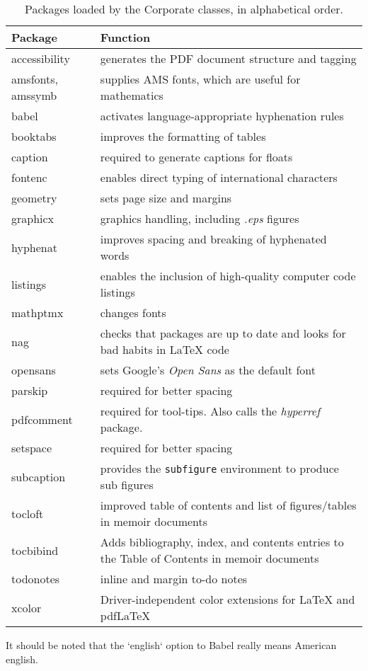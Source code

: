 \begin{table*}[!ht]
\centering
\caption[Packages loaded by the Corporate classes]{Packages loaded by the Corporate classes, in alphabetical order.}
\label{Tab:Packages}
\begin{tabular}[h]{l p{}}
\toprule
Package & Function\\
\midrule
accessibility & generates the PDF document structure and tagging \\
amsfonts, amssymb& supplies AMS fonts, which are useful for mathematics \\
babel & activates language-appropriate hyphenation rules\\
booktabs & improves the formatting of tables \\
caption & required to generate captions for floats\\
fontenc & enables direct typing of international characters \\
geometry & sets page size and margins \\
graphicx & graphics handling, including \emph{.eps} figures \\
hyphenat & improves spacing and breaking of hyphenated words \\
listings & enables the inclusion of high-quality computer code listings\\
mathptmx & changes fonts \\
nag & checks that packages are up to date and looks for bad habits in LaTeX code\\
opensans & sets Google's \emph{Open Sans} as the default font\\
parskip & required for better spacing\\
pdfcomment & required for tool-tips. Also calls the \emph{hyperref} package.\\
setspace & required for better spacing\\
subcaption & provides the \texttt{subfigure} environment to produce sub figures \\
tocloft & improved table of contents and list of figures/tables in memoir documents\\
tocbibind & Adds bibliography, index, and contents entries to the Table of Contents in memoir documents\\
todonotes & inline and margin to-do notes \\
xcolor & Driver-independent color extensions for LaTeX and pdfLaTeX\\
\bottomrule
\end{tabular}
\end{table*}

It should be noted that the `english` option to Babel really means American english.
